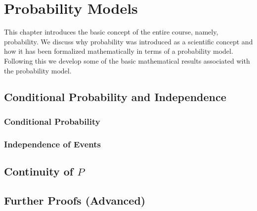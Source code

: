 \chapter{Probability Models}\label{chap:probability_models}
\minitoc
This chapter introduces the basic concept of the entire course, namely, probability. We discuss why probability was introduced as a scientific concept and how it has been formalized mathematically in terms of a probability model. Following this we develop some of the basic mathematical results associated with the probability model.






\section{Conditional Probability and Independence}\label{cond_prob_indp}
\lipsum[1-10]

\subsection{Conditional Probability}
\lipsum[1-10]

\subsection{Independence of Events}\label{independence_of_events}
\lipsum[1-10]

\section{Continuity of $P$}
\lipsum[1-10]

\section{Further Proofs (Advanced)}\label{ch2:adv_proofs}
\lipsum[1-10]